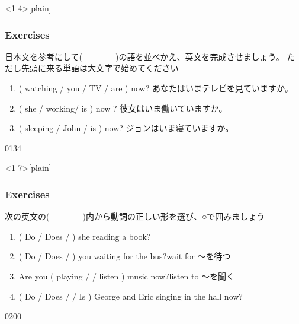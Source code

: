 \documentclass[aspectratio=169,xcolor={dvipsnames,table}]{beamer}
\newcommand{\myaudio}[1]{\href{#1}{\faVolumeUp}}
\begin{document}
\begin{frame}<1-4>[plain]\frametitle{Exercises}

{\small 日本文を参考にして(~~~~~~~~)の語を並べかえ、英文を完成させましょう。
ただし先頭に来る単語は大文字で始めてください}

\begin{enumerate}
 \item  ( watching /  you  / TV / are ) now?\hfill%
あなたはいまテレビを見ていますか。\\%
 \item ( she / working/ is ) now ?
\hspace{5.3\zw}彼女はいま働いていますか。\\
 \item ( sleeping / John / is ) now?\hspace{4.8\zw}%
ジョンはいま寝ていますか。\\
\end{enumerate}

\mbox{}\hfill{\tiny 0134}\,{\scriptsize \myaudio{./audio/023_is_ing_question_02.mp3}}
\end{frame}
\begin{frame}<1-7>[plain]\frametitle{Exercises}

{\small 次の英文の(~~~~~~~~)内から動詞の正しい形を選び、○で囲みましょう}

\begin{enumerate}
 \item ( Do / Does /  ) she reading a book?\hspace{10pt}\raisebox{0pt}{\bcbook}
 \item ( Do / Does /  ) you waiting for the bus?\hspace{10pt}\hfill{\scriptsize wait for ～を待つ}
 \item Are you ( playing /  / listen )  music now?\hfill{\scriptsize listen to ～を聞く}\\
\hfill{}
  \item ( Do / Does /  / Is ) George and Eric singing in the hall now?\hspace{10pt}\\
\hfill{}
\end{enumerate}
\pause

\vfill

\mbox{}\hfill{\tiny 0200}\,{\scriptsize \myaudio{./audio/023_is_ing_question_03.mp3}}
\end{frame}
\end{document}
